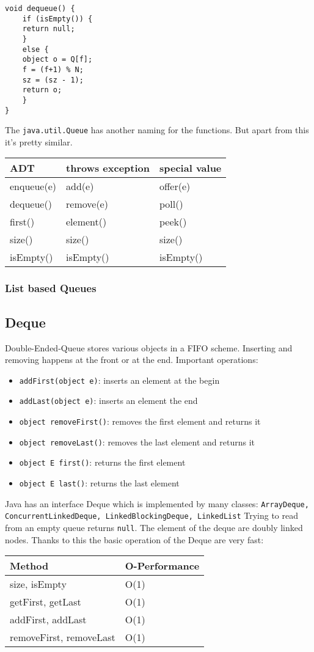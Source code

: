 \documentclass[11pt,twoside,landscape]{article}
\begin{document}
\begin{multicols}{2}
\begin{verbatim}
void dequeue() {
    if (isEmpty()) {
	return null;
    }
    else {
	object o = Q[f];
	f = (f+1) % N;
	sz = (sz - 1);
	return o;
    }
}
\end{verbatim}

The \texttt{java.util.Queue} has another naming for the functions. But apart from this it's pretty similar.
\begin{center}
\begin{tabular}{lll}
ADT & throws exception & special value\\
\hline
enqueue(e) & add(e) & offer(e)\\
dequeue() & remove(e) & poll()\\
first() & element() & peek()\\
size() & size() & size()\\
isEmpty() & isEmpty() & isEmpty()\\
\end{tabular}
\end{center}
\subsubsection*{List based Queues}
\label{sec:orge3d4ebe}
\subsection*{Deque}
\label{sec:orgacc98ee}
Double-Ended-Queue stores various objects in a FIFO scheme. Inserting and removing happens at the front or at the end. Important operations:
\begin{itemize}
\item \texttt{addFirst(object e)}: inserts an element at the begin
\item \texttt{addLast(object e)}: inserts an element the end
\item \texttt{object removeFirst()}: removes the first element and returns it
\item \texttt{object removeLast()}: removes the last element and returns it
\item \texttt{object E first()}: returns the first element
\item \texttt{object E last()}: returns the last element
\end{itemize}

Java has an interface Deque which is implemented by many classes: \texttt{ArrayDeque, ConcurrentLinkedDeque, LinkedBlockingDeque, LinkedList}
Trying to read from an empty queue returns \texttt{null}. The element of the deque are doubly linked nodes. Thanks to this the basic operation of the Deque are very fast:
\begin{center}
\begin{tabular}{ll}
Method & O-Performance\\
\hline
size, isEmpty & O(1)\\
getFirst, getLast & O(1)\\
addFirst, addLast & O(1)\\
removeFirst, removeLast & O(1)\\
\end{tabular}
\end{center}

\end{multicols}
\end{document}
